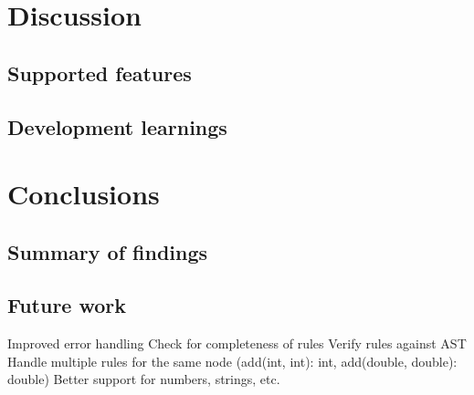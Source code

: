 \documentclass[nofilelist]{cslthse-msc}
\begin{document}
\chapter{Discussion} %
\section{Supported features}
\section{Development learnings}

\chapter{Conclusions} %
\section{Summary of findings}
\section{Future work}
Improved error handling
Check for completeness of rules
Verify rules against AST
Handle multiple rules for the same node (add(int, int): int, add(double, double): double)
Better support for numbers, strings, etc.


{} %
\end{document}

